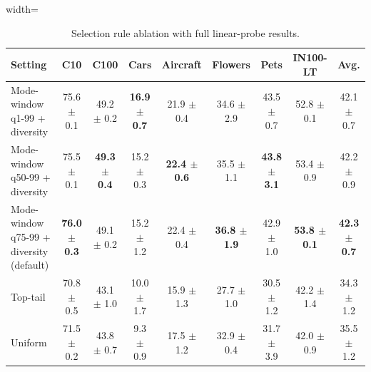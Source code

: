 \begin{table}[H]
\centering
\scriptsize
\setlength{\tabcolsep}{3.5pt}
\caption{Selection rule ablation with full linear-probe results.}
\label{tab:app_selection_linear}
\begin{adjustbox}{width=\textwidth}
\begin{tabular}{l c c c c c c c c}
\toprule
Setting & C10 & C100 & Cars & Aircraft & Flowers & Pets & IN100-LT & Avg. \\
\midrule
Mode-window q1-99 + diversity & 75.6 {\scriptsize$\pm$ 0.1} & 49.2 {\scriptsize$\pm$ 0.2} & \textbf{16.9 {\scriptsize$\pm$ 0.7}} & 21.9 {\scriptsize$\pm$ 0.4} & 34.6 {\scriptsize$\pm$ 2.9} & 43.5 {\scriptsize$\pm$ 0.7} & 52.8 {\scriptsize$\pm$ 0.1} & 42.1 {\scriptsize$\pm$ 0.7} \\
Mode-window q50-99 + diversity & 75.5 {\scriptsize$\pm$ 0.1} & \textbf{49.3 {\scriptsize$\pm$ 0.4}} & 15.2 {\scriptsize$\pm$ 0.3} & \textbf{22.4 {\scriptsize$\pm$ 0.6}} & 35.5 {\scriptsize$\pm$ 1.1} & \textbf{43.8 {\scriptsize$\pm$ 3.1}} & 53.4 {\scriptsize$\pm$ 0.9} & 42.2 {\scriptsize$\pm$ 0.9} \\
Mode-window q75-99 + diversity (default) & \textbf{76.0 {\scriptsize$\pm$ 0.3}} & 49.1 {\scriptsize$\pm$ 0.2} & 15.2 {\scriptsize$\pm$ 1.2} & 22.4 {\scriptsize$\pm$ 0.4} & \textbf{36.8 {\scriptsize$\pm$ 1.9}} & 42.9 {\scriptsize$\pm$ 1.0} & \textbf{53.8 {\scriptsize$\pm$ 0.1}} & \textbf{42.3 {\scriptsize$\pm$ 0.7}} \\
Top-tail & 70.8 {\scriptsize$\pm$ 0.5} & 43.1 {\scriptsize$\pm$ 1.0} & 10.0 {\scriptsize$\pm$ 1.7} & 15.9 {\scriptsize$\pm$ 1.3} & 27.7 {\scriptsize$\pm$ 1.0} & 30.5 {\scriptsize$\pm$ 1.2} & 42.2 {\scriptsize$\pm$ 1.4} & 34.3 {\scriptsize$\pm$ 1.2} \\
Uniform & 71.5 {\scriptsize$\pm$ 0.2} & 43.8 {\scriptsize$\pm$ 0.7} & 9.3 {\scriptsize$\pm$ 0.9} & 17.5 {\scriptsize$\pm$ 1.2} & 32.9 {\scriptsize$\pm$ 0.4} & 31.7 {\scriptsize$\pm$ 3.9} & 42.0 {\scriptsize$\pm$ 0.9} & 35.5 {\scriptsize$\pm$ 1.2} \\
\bottomrule
\end{tabular}
\end{adjustbox}
\end{table}
